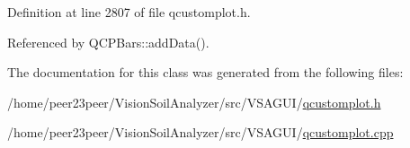 Definition at line 2807 of file qcustomplot.\+h.



Referenced by Q\+C\+P\+Bars\+::add\+Data().



The documentation for this class was generated from the following files\+:\begin{DoxyCompactItemize}
\item 
/home/peer23peer/\+Vision\+Soil\+Analyzer/src/\+V\+S\+A\+G\+U\+I/\hyperlink{qcustomplot_8h}{qcustomplot.\+h}\item 
/home/peer23peer/\+Vision\+Soil\+Analyzer/src/\+V\+S\+A\+G\+U\+I/\hyperlink{qcustomplot_8cpp}{qcustomplot.\+cpp}\end{DoxyCompactItemize}
